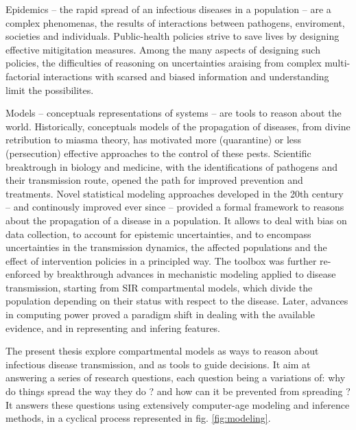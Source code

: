 Epidemics -- the rapid spread of an infectious diseases in a population -- are a complex phenomenas, the results of interactions between pathogens, enviroment, societies and individuals\cite{Rinaldo:RiverNetworksEcological:2020a, Buckee:ThinkingClearlySocial:2021, Heesterbeek:ModelingInfectiousDisease:2015}. Public-health policies strive to save lives by designing effective mitigitation measures. Among the many aspects of designing such policies, the difficulties of reasoning on uncertainties araising from complex multi-factorial interactions with scarsed and biased information and understanding limit the possibilites. 

Models -- conceptuals representations of systems -- are tools to reason about the world. Historically, conceptuals models of the propagation of diseases, from divine retribution to miasma theory, has motivated more (quarantine) or less (persecution) effective approaches to the control of these pests. Scientific breaktrough in biology and medicine, with the identifications of pathogens and their transmission route, opened the path for improved prevention and treatments. Novel statistical modeling approaches\cite[-3\baselineskip]{Freedman:AssociationCausationRemarks:1999} developed in the 20th century -- and continously improved ever since\cite{Gelman:WhatAreMost:2021} --  provided a formal framework to reasons about the propagation of a disease in a population. It allows to deal with bias on data collection, to account for epistemic uncertainties, and to encompass uncertainties in the transmission dynamics, the affected populations and the effect of intervention policies in a principled way. The toolbox was further re-enforced by breakthrough advances in mechanistic modeling applied to disease transmission, starting from SIR compartmental models\cite{Kermack:ContributionMathematicalTheory:1927, Anderson:PopulationBiologyInfectious:1979}, which divide the population depending on their status with respect to the disease. Later, advances in computing power proved a paradigm shift in dealing with the available evidence, and in representing and infering features. 

The present thesis explore compartmental models as ways to reason about infectious disease transmission, and as tools to guide decisions. It aim at answering a series of research questions, each question being a variations of: why do things spread the way they do ? and how can it be prevented from spreading ? It answers these questions using extensively computer-age modeling and inference methods, in a cyclical process represented in fig. \ref{fig:modeling}. %

